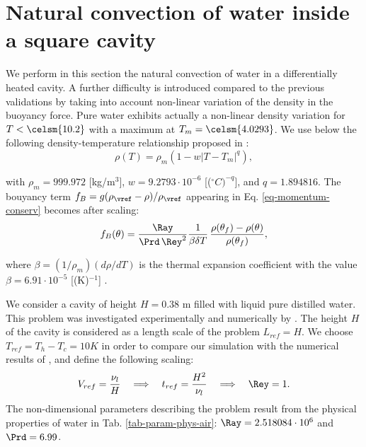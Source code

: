
\section{Natural convection of water inside a square cavity}\label{sec: natconv-water}
We perform in this section the natural convection of water in a differentially heated cavity. 
A further difficulty is introduced compared to the previous validations by taking into account non-linear variation of the density in the buoyancy force.
Pure water exhibits actually a non-linear density variation for $T< \celsm{10.2}$ with a maximum at $T_m= \celsm{4.0293}$. 
We use below the following density-temperature relationship  proposed in \cite{Gebhart1977}:
\begin{equation}\label{eq-dens-nonlin}
\rho(T)=\rho_m \left(1 - w \left|T - T_m\right|^q\right),
\end{equation}

\noindent with $\rho_m=999.972$ [kg/m$^3$], $w=9.2793\cdot 10^{-6}$ [($^\circ C)^{-q}$], and $q=1.894816$.
The bouyancy term $f_B = g(\rho_\vref-\rho)/\rho_\vref$ appearing in Eq. \ref{eq-momentum-conserv}  becomes after scaling:
\begin{equation}
f_B(\theta) = \frac{\Ray}{\Prd \, \Rey^2} \frac{1}{\beta \delta T}\, \frac{\rho(\theta_f)-\rho(\theta)}{\rho(\theta_f)},
\label{eq-fBnonlin}
\end{equation}

\noindent where $\beta=(1/\rho_m) \left(d\rho/dT\right)$ is the thermal expansion coefficient with the value $\beta=6.91 \cdot 10^{-5}$ [(K)$^{-1}$] \citep{Scanlon2004}.

We consider a cavity of height $H = 0.38$ m filled with liquid pure distilled water.
This problem was investigated experimentally and numerically by \cite{Giangi-2000,Kowalewski-1999,Kowalewski-2003}.
The height $H$ of the cavity is considered as a length scale of the problem $L_{ref} = H$. 
We choose $T_{ref} = T_h - T_c = 10 K$ in order to compare our simulation with the numerical results of \cite{Kowalewski-2003},
and define the following scaling:
\begin{equation} \label{eq-def-scal-1}
   V_{ref} = \frac{\nu_l}{H} 
   \quad \Longrightarrow \quad t_{ref} = \frac{H^2}{\nu_l}
   \quad \Longrightarrow \quad \Rey = 1.
\end{equation} 
The non-dimensional parameters describing the problem result from the physical properties of water in Tab. \ref{tab-param-phys-air}: $\Ray=2.518084\cdot 10^{6}$ and $\Prd=6.99$. %

